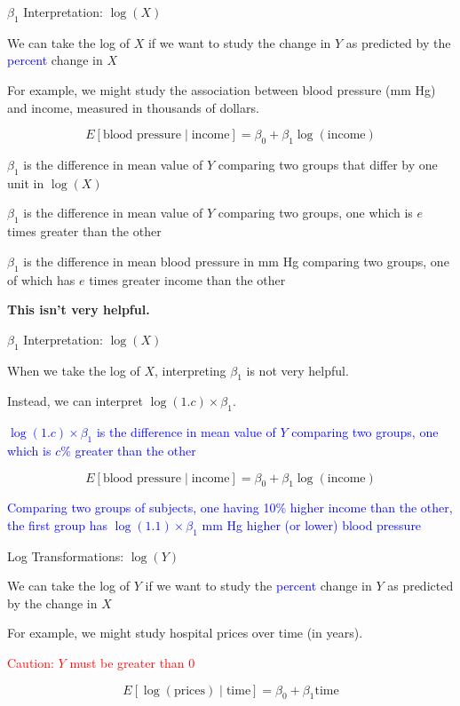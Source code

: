 \documentclass[10pt,t]{beamer}
\begin{document}
\begin{frame}{$\beta_1$ Interpretation: $\log(X)$}
	
	\vspace{-5 mm}
	
	We can take the log of $X$ if we want to study the change in $Y$ as predicted by the \textcolor{blue}{percent} change in $X$
	\medskip
	
	For example, we might study the association between blood pressure (mm Hg) and income, measured in thousands of dollars. 
	\medskip
	
	$$
	E[\text{blood pressure} \mid \text{income}] = \beta_0 + \beta_1 \log(\text{income})
	$$
	\bigskip
	
	$\beta_1$ is the difference in mean value of $Y$ comparing two groups that differ by one unit in $\log(X)$
	\medskip
	
	$\beta_1$ is the difference in mean value of $Y$ comparing two groups, one which is $e$ times greater than the other
	\bigskip
	
		$\beta_1$ is the difference in mean blood pressure in mm Hg comparing two groups, one of which has $e$ times greater income than the other
	\bigskip
	
	{\color{blue}\textbf{This isn't very helpful.}}
	
\end{frame}

\begin{frame}{$\beta_1$ Interpretation: $\log(X)$}
	
	When we take the log of $X$, interpreting $\beta_1$ is not very helpful.
	\medskip
	
	Instead, we can interpret $\log(1.c)\times \beta_1$. 
	\medskip
	
	\textcolor{blue}{$\log(1.c)\times\beta_1$ is the difference in mean value of $Y$ comparing two groups, one which is $c\%$ greater than the other}
	\bigskip
	
		$$
	E[\text{blood pressure} \mid \text{income}] = \beta_0 + \beta_1 \log(\text{income})
	$$
	\medskip
	
	\textcolor{blue}{Comparing two groups of subjects, one having 10\% higher income than the other, the first group has $\log(1.1)\times\beta_1$ mm Hg higher (or lower) blood pressure}

	
\end{frame}



\begin{frame}{Log Transformations: $\log(Y)$}
	
	We can take the log of $Y$ if we want to study the \textcolor{blue}{percent} change in $Y$ as predicted by the change in $X$
	\medskip
	
	For example, we might study hospital prices over time (in years). 
	\medskip
	
	\textcolor{red}{Caution: $Y$ must be greater than 0} 
	
	$$
	E[\log(\text{prices}) \mid \text{time}] = \beta_0 + \beta_1 \text{time}
	$$
	
\end{frame}
\end{document}
